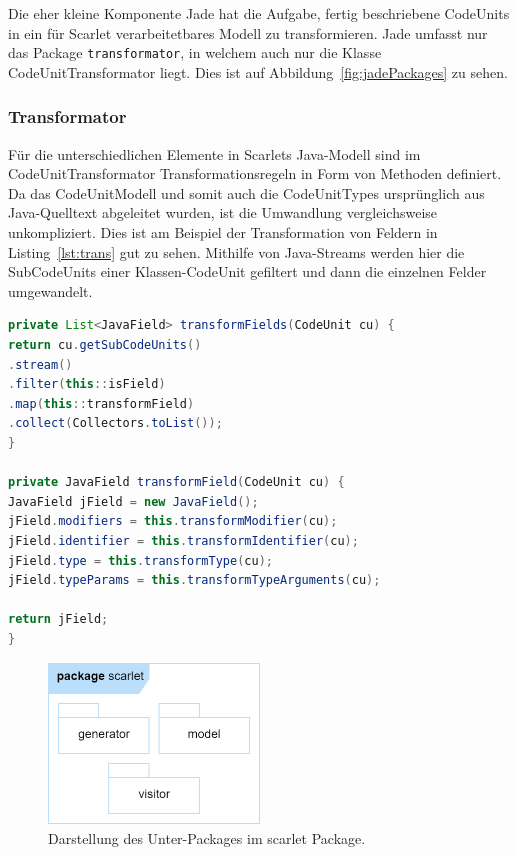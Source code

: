 \documentclass[12pt,oneside,a4paper,parskip]{scrbook}
\begin{document}
Die eher kleine Komponente Jade hat die Aufgabe, fertig beschriebene CodeUnits in ein für Scarlet verarbeitetbares Modell zu transformieren. Jade umfasst nur das Package \texttt{transformator}, in welchem auch nur die Klasse CodeUnitTransformator liegt. Dies ist auf Abbildung~\ref{fig:jadePackages} zu sehen.

\subsubsection{Transformator}

Für die unterschiedlichen Elemente in Scarlets Java-Modell sind im CodeUnitTransformator Transformationsregeln in Form von Methoden definiert. Da das CodeUnitModell und somit auch die CodeUnitTypes ursprünglich aus Java-Quelltext abgeleitet wurden, ist die Umwandlung vergleichsweise unkompliziert. Dies ist am Beispiel der Transformation von Feldern in Listing~\ref{lst:trans} gut zu sehen. Mithilfe von Java-Streams werden hier die SubCodeUnits einer Klassen-CodeUnit gefiltert und dann die einzelnen Felder umgewandelt.

\begin{lstlisting}[label=lst:trans,
language=java,
firstnumber=1,
caption=Umwandlung der Felder in den SubCodeUnits einer CodeUnit. Auszug aus der Klasse CodeUnitTransformator.]
private List<JavaField> transformFields(CodeUnit cu) {
return cu.getSubCodeUnits()
.stream()
.filter(this::isField)
.map(this::transformField)
.collect(Collectors.toList());
}

private JavaField transformField(CodeUnit cu) {
JavaField jField = new JavaField();
jField.modifiers = this.transformModifier(cu);
jField.identifier = this.transformIdentifier(cu);
jField.type = this.transformType(cu);
jField.typeParams = this.transformTypeArguments(cu);

return jField;
}
\end{lstlisting}

\begin{figure}[htbp]
\centering
\includegraphics[width=0.5\textwidth]{bilder/scarlet}
\caption{Darstellung des Unter-Packages im scarlet Package.}
\label{fig:scarletPackages}
\end{figure}
\end{document}
